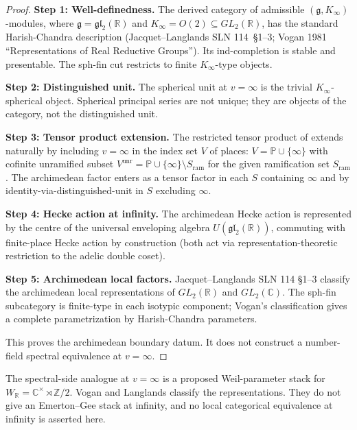 \begin{proof}
\textbf{Step 1: Well-definedness.} The derived category of admissible
\((\mathfrak{g}, K_{\infty})\)-modules, where
\(\mathfrak{g}=\mathfrak{gl}_{2}(\mathbb{R})\) and
\(K_{\infty}=O(2)\subseteq GL_{2}(\mathbb{R})\), has the standard
Harish-Chandra description (Jacquet--Langlands SLN 114~\S1--3;
Vogan 1981 ``Representations of Real Reductive Groups''). Its
ind-completion is stable and presentable. The sph-fin cut restricts to
finite \(K_{\infty}\)-type objects.

\textbf{Step 2: Distinguished unit.} The spherical unit at
\(v=\infty\) is the trivial \(K_{\infty}\)-spherical object.  Spherical
principal series are not unique; they are objects of the category, not
the distinguished unit.

\textbf{Step 3: Tensor product extension.} The restricted tensor
product of  extends
naturally by including \(v=\infty\) in the index set \(V\) of places:
\(V=\mathbb{P}\cup\{\infty\}\) with cofinite unramified subset
\(V^{\mathrm{unr}}=\mathbb{P}\cup\{\infty\}\setminus S_{\mathrm{ram}}\)
for the given ramification set \(S_{\mathrm{ram}}\). The archimedean
factor enters as a tensor factor in each \(S\) containing \(\infty\) and
by identity-via-distinguished-unit in \(S\) excluding \(\infty\).

\textbf{Step 4: Hecke action at infinity.} The archimedean Hecke
action is represented by the centre of the universal enveloping algebra
\(U(\mathfrak{gl}_{2}(\mathbb{R}))\), commuting with finite-place
Hecke action by construction (both act via representation-theoretic
restriction to the adelic double coset).

\textbf{Step 5: Archimedean local factors.} Jacquet--Langlands SLN
114 \S1--3 classify the archimedean local representations of
\(GL_{2}(\mathbb{R})\) and \(GL_{2}(\mathbb{C})\). The sph-fin
subcategory is finite-type in each isotypic component; Vogan's
classification gives a complete parametrization by
Harish-Chandra parameters.

This proves the archimedean boundary datum. It does not construct a
number-field spectral equivalence at \(v=\infty\).
\end{proof}

\begin{remark}
\label{v4-arith:acd:rem:archimedean-spectral}
The spectral-side analogue at \(v=\infty\) is
a proposed Weil-parameter stack for
\(W_{\mathbb{R}}=\mathbb{C}^{\times}\rtimes\mathbb{Z}/2\).  Vogan and
Langlands classify the representations.  They do not give an
Emerton--Gee stack at infinity, and no local categorical equivalence at
infinity is asserted here.
\end{remark}


